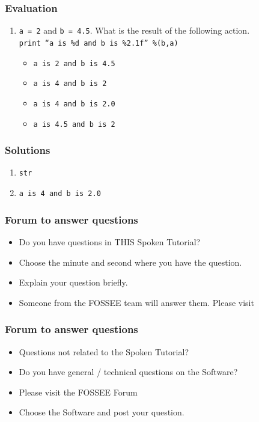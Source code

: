 \documentclass[17pt]{beamer}
\newcounter{saveenumi}
\newcommand{\conti}{\setcounter{enumi}{\value{saveenumi}}}
\begin{document}
\begin{frame}
\frametitle{Evaluation}
\label{sec-8.1}
\begin{enumerate}
\conti
\item \texttt{a = 2} and \texttt{b = 4.5}. 
   What is the result of the following action.\\
  \texttt{print ``a is \%d and b is \%2.1f'' \%(b,a)} \pause
\begin{itemize}
\item \texttt{a is 2 and b is 4.5}
\item \texttt{a is 4 and b is 2}
\item \texttt{a is 4 and b is 2.0}
\item \texttt{a is 4.5 and b is 2}
\end{itemize}
\end{enumerate}
\end{frame}


\begin{frame}
\frametitle{Solutions}
\label{sec-9}

\begin{enumerate}
\item \texttt{str}
\vspace{12pt}
\item \texttt{a is 4 and b is 2.0}
\end{enumerate}
\end{frame}

\begin{frame}
\frametitle{Forum to answer questions}
\begin{itemize}
\item Do you have questions in THIS Spoken Tutorial?
\item Choose the minute and second where you have the question.
\item Explain your question briefly.
\item Someone from the FOSSEE team will answer them. Please visit 
\end{itemize}
\begin{center}
{\color{blue}{http://forums.spoken-tutorial.org/}}
 \end{center} 
\end{frame}
\begin{frame}
\frametitle{Forum to answer questions}
\begin{itemize}
\item Questions not related to the Spoken Tutorial?
\item Do you have general / technical questions on the Software?
\item Please visit the FOSSEE Forum
\begin{center}
{\color{blue}{http://forums.fossee.in/}}
 \end{center}
\item Choose the Software and post your question.
\end{itemize}
\end{frame}
\end{document}
